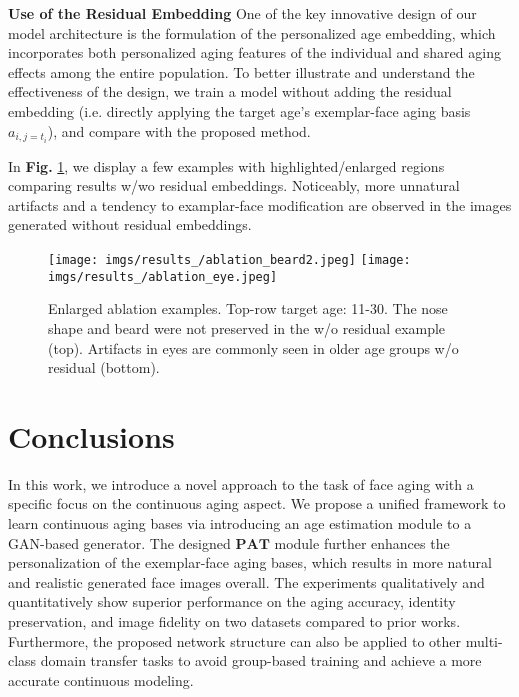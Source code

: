 \documentclass[final]{cvpr}
\begin{document}
\textbf{Use of the Residual Embedding} One of the key innovative design of our model architecture is the formulation of the personalized age embedding, which incorporates both personalized aging features of the individual and shared aging effects among the entire population. To better illustrate and understand the effectiveness of the design, we train a model without adding the residual embedding (i.e. directly applying the target age's exemplar-face aging basis \(a_{i,j=t_i}\)), and compare with the proposed method.

In \textbf{Fig.} \ref{ablation_img}, we display a few examples with highlighted/enlarged regions comparing results w/wo residual embeddings. Noticeably, more unnatural artifacts and a tendency to examplar-face modification are observed in the images generated without residual embeddings.


\begin{figure}[h!]
    \centering
    \vspace{-0.2cm}
    \texttt{[image: imgs/results\_/ablation\_beard2.jpeg]}
    \texttt{[image: imgs/results\_/ablation\_eye.jpeg]}
    \caption{Enlarged ablation examples. Top-row target age: 11-30. The nose shape and beard were not preserved in the w/o residual example (top). Artifacts in eyes are commonly seen in older age groups w/o residual (bottom).}
    \vspace{-0.5cm}
    \label{ablation_img}
\end{figure}

\section{Conclusions}
In this work, we introduce a novel approach to the task of face aging with a specific focus on the continuous aging aspect. We propose a unified framework to learn continuous aging bases via introducing an age estimation module to a GAN-based generator. The designed \(\mathbf{PAT}\) module further enhances the personalization of the exemplar-face aging bases, which results in more natural and realistic generated face images overall. The experiments qualitatively and quantitatively show superior performance on the aging accuracy, identity preservation, and image fidelity on two datasets compared to prior works. Furthermore, the proposed network structure can also be applied to other multi-class domain transfer tasks to avoid group-based training and achieve a more accurate continuous modeling.
\end{document}
